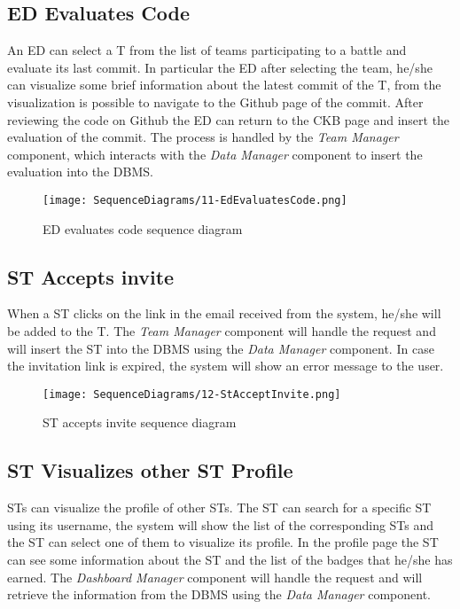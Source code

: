 \subsection*{ED Evaluates Code}
An ED can select a T from the list of teams participating to a battle and evaluate its last commit. In particular the ED after selecting the team, he/she can visualize some brief information about the latest commit of the T, from the visualization is possible to navigate to the Github page of the commit. After reviewing the code on Github the ED can return to the CKB page and insert the evaluation of the commit. The process is handled by the \textit{Team Manager} component, which interacts with the \textit{Data Manager} component to insert the evaluation into the DBMS.

\begin{figure}[H]
  \centering
  \texttt{[image: SequenceDiagrams/11-EdEvaluatesCode.png]}
  \caption{ED evaluates code sequence diagram}
  \label{fig:ed_evaluates_code}
\end{figure}

\subsection*{ST Accepts invite}
When a ST clicks on the link in the email received from the system, he/she will be added to the T. The \textit{Team Manager} component will handle the request and will insert the ST into the DBMS using the \textit{Data Manager} component. In case the invitation link is expired, the system will show an error message to the user.

\begin{figure}[H]
  \centering
  \texttt{[image: SequenceDiagrams/12-StAcceptInvite.png]}
  \caption{ST accepts invite sequence diagram}
  \label{fig:st_accepts_invite}
\end{figure}

\subsection*{ST Visualizes other ST Profile}
STs can visualize the profile of other STs. The ST can search for a specific ST using its username, the system will show the list of the corresponding STs and the ST can select one of them to visualize its profile. In the profile page the ST can see some information about the ST and the list of the badges that he/she has earned. The \textit{Dashboard Manager} component will handle the request and will retrieve the information from the DBMS using the \textit{Data Manager} component.

